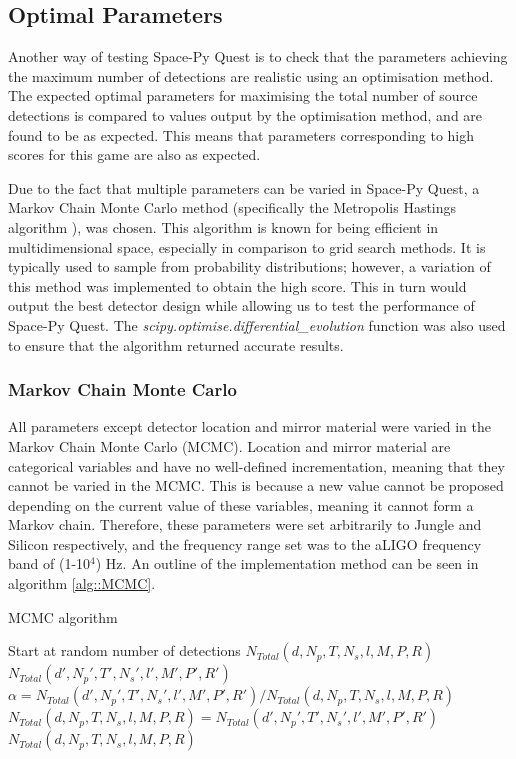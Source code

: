 \documentclass{article}
\begin{document}
\subsection{Optimal Parameters}
Another way of testing Space-Py Quest is to check that the parameters achieving the maximum number of detections are realistic using an optimisation method. The expected optimal parameters for maximising the total number of source detections is compared to values output by the optimisation method, and are found to be as expected. This means that parameters corresponding to high scores for this game are also as expected. 

Due to the fact that multiple parameters can be varied in Space-Py Quest, a Markov Chain Monte Carlo method (specifically the Metropolis Hastings algorithm \cite{metropolis, hastings}), was chosen. This algorithm is known for being efficient in multidimensional space, especially in comparison to grid search methods. It is typically used to sample from probability distributions; however, a variation of this method was implemented to obtain the high score. This in turn would output the best detector design while allowing us to test the performance of Space-Py Quest. The \textit{scipy.optimise.differential\_evolution} \cite{scipy} function was also used to ensure that the algorithm returned accurate results. 

\subsubsection{Markov Chain Monte Carlo}
All parameters except detector location and mirror material were varied in the Markov Chain Monte Carlo (MCMC). Location and mirror material are categorical variables and have no well-defined incrementation, meaning that they cannot be varied in the MCMC. This is because a new value cannot be proposed depending on the current value of these variables, meaning it cannot form a Markov chain. Therefore, these parameters were set arbitrarily to Jungle and Silicon respectively, and the frequency range set was to the aLIGO frequency band of (1-10$^4$) Hz. An outline of the implementation method can be seen in algorithm \ref{alg::MCMC}.

\begin{algorithm}
\caption{MCMC algorithm}
\label{alg::MCMC}
\begin{algorithmic}
\item{Start at random number of detections} $N_{Total}(d, N_p, T, N_s, l, M, P, R)$ 
    \State {} $N_{Total}(d', N_p', T', N_s', l', M', P', R')$
    \State $\alpha = N_{Total}(d', N_p', T', N_s', l', M', P', R')/N_{Total}(d, N_p, T, N_s, l, M, P, R)$
    \State $N_{Total}(d, N_p, T, N_s, l, M, P, R) = N_{Total}(d', N_p', T', N_s', l', M', P', R')$
    \EndIf
    \State {} $N_{Total}(d, N_p, T, N_s, l, M, P, R)$
\EndFor
\end{algorithmic}
\end{algorithm}
\end{document}
